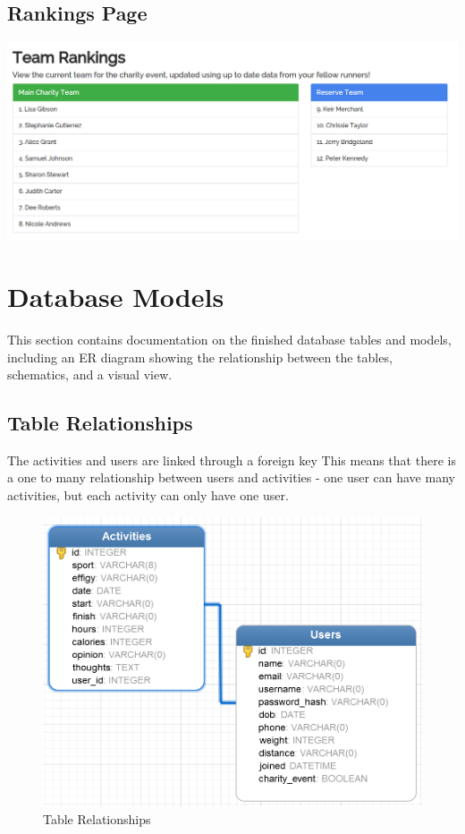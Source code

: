 \documentclass{article}[12pt,a4paper]
\begin{document}
\subsection{Rankings Page}
\includegraphics[scale=0.35]{final_ui/rankings}

\section{Database Models}
This section contains documentation on the finished database tables and models, including an ER diagram showing the relationship between the tables, schematics, and a visual view.

\subsection{Table Relationships}
The activities and users are linked through a foreign key This means that there is a one to many relationship between users and activities - one user can have many activities, but each activity can only have one user.

\begin{figure}[h!]
  \includegraphics[scale=0.5]{images/database/er_diagram}
  \caption{Table Relationships}
\end{figure}
\end{document}
